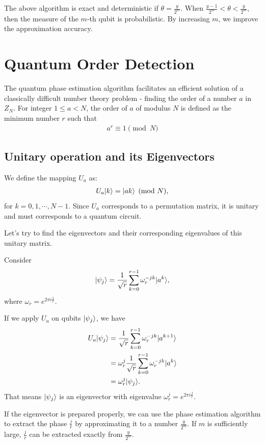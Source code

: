 The above algorithm is exact and deterministic if \(\theta = \frac{y}{2^m}\). When \(\frac{y-1}{2^m} < \theta < \frac{y}{2^m}\), then the measure of the \(m\)-th qubit is probabilistic. By increasing \(m\), we improve the approximation accuracy.

\section{Quantum Order Detection}
The quantum phase estimation algorithm facilitates an efficient solution of a classically difficult number theory problem - finding the order of a number \(a\) in \(Z_N\). For integer \(1\leq a < N\), the order of \(a\) of modulus \(N\) is defined as the minimum number \(r\) such that 
\begin{align*}
    a^r \equiv 1 \pmod {N}
\end{align*}

\subsection{Unitary operation and its Eigenvectors}
We define the mapping \(U_a\) as:
\begin{align*}
    U_a \lvert k\rangle = \lvert ak\rangle  \pmod{N}, 
\end{align*}
for \(k=0, 1, \cdots, N-1.\)
Since \(U_a\) corresponds to a permutation matrix, it is unitary and must corresponds to a quantum circuit. 

Let's try to find the eigenvectors and their corresponding eigenvalues of this unitary matrix. 

Consider 
\begin{align*}
    \lvert\psi_j\rangle = \frac{1}{\sqrt{r}} \sum_{k=0}^{r-1} \omega_r^{-jk}\lvert a^k\rangle,
\end{align*}
where \(\omega_r = e^{2\pi i \frac{1}{r}}.\)

If we apply \(U_a\) on qubits \(\lvert\psi_j\rangle\), we have 
\begin{align*}
    U_a \lvert\psi_j\rangle &= \frac{1}{\sqrt{r}} \sum_{k=0}^{r-1} \omega_r^{-jk}\lvert a^{k+1}\rangle\\
    &= \omega_r^{j} \frac{1}{\sqrt{r}} \sum_{k=0}^{r-1} \omega_r^{-jk}\lvert a^k\rangle \\
    &= \omega_r^{j} \lvert\psi_j\rangle.
\end{align*}
That means \(\lvert\psi_j\rangle\) is an eigenvector with eigenvalue \(\omega_r^{j} = e^{2\pi i \frac{j}{r}}\).

If the eigenvector is prepared properly, we can use the phase estimation algorithm to extract the phase \(\frac{j}{r}\) by approximating it to a number \(\frac{y}{2^m}\). If \(m\) is sufficiently large, \(\frac{j}{r}\) can be extracted exactly from \(\frac{y}{2^m}\).



